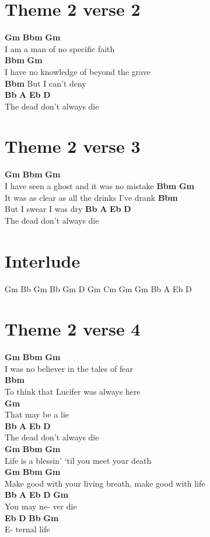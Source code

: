 \documentclass{article}
\begin{document}
\section*{Theme 2 verse 2}
\textbf{Gm}     \textbf{Bbm}                \textbf{Gm}\\
I am a man of no specific faith\\
\textbf{Bbm}                     \textbf{Gm}\\
I have no knowledge of beyond the grave\\
\textbf{Bbm}
But I can’t deny\\
\textbf{Bb}         \textbf{A}      \textbf{Eb} \textbf{D}\\
The dead don’t always die

\section*{Theme 2 verse 3}
\textbf{Gm}            \textbf{Bbm}                    \textbf{Gm}\\
I have seen a ghost and it was no mistake
\textbf{Bbm}                          \textbf{Gm}\\
It was as clear as all the drinks I’ve drank
\textbf{Bbm}\\
But I swear I was dry
\textbf{Bb}         \textbf{A}      \textbf{Eb} \textbf{D}\\
The dead don’t always die

\section*{Interlude}
Gm     Bb
Gm
Bb     Gm
D
Gm     Cm
Gm
Gm
Bb  A  Eb D

\section*{Theme 2 verse 4}
\textbf{Gm}         \textbf{Bbm}           \textbf{Gm}\\
I was no believer in the tales of fear\\
\textbf{Bbm}\\
To think that Lucifer was always here\\
\textbf{Gm}\\
 That may be a lie\\
 \textbf{Bb}         \textbf{A}      \textbf{Eb} \textbf{D}\\
The dead don’t always die\\
\textbf{Gm}        \textbf{Bbm}                         \textbf{Gm}\\
Life is a blessin’ ‘til you meet your death\\
\textbf{Gm}                    \textbf{Bbm}          \textbf{Gm}\\
Make good with your living breath, make good with life\\
\textbf{Bb}  \textbf{A}   \textbf{Eb}  \textbf{D}   \textbf{Gm}\\
You may ne- ver die\\
\textbf{Eb} \textbf{D}  \textbf{Bb}  \textbf{Gm}\\
E- ternal life
\end{document}
